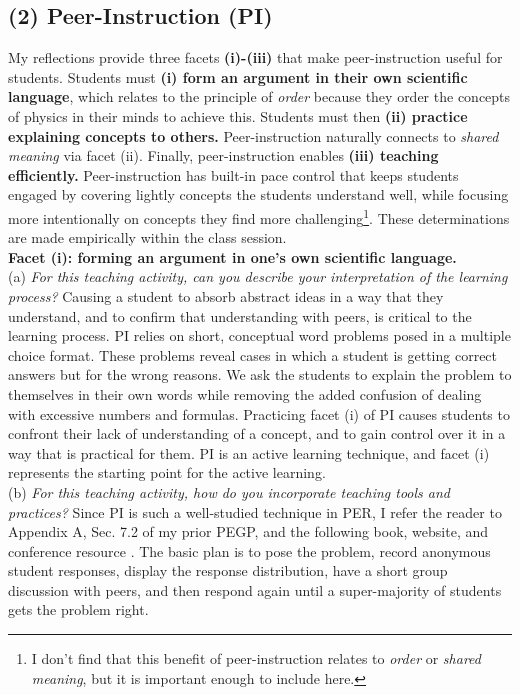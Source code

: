 \documentclass[../../../main.tex]{subfiles}
\begin{document}
\subsection{(2) Peer-Instruction (PI)}

My reflections provide three facets \textbf{(i)-(iii)} that make peer-instruction useful for students.  Students must \textbf{(i) form an argument in their own scientific language}, which relates to the principle of \textit{order} because they order the concepts of physics in their minds to achieve this.  Students must then \textbf{(ii) practice explaining concepts to others.}  Peer-instruction naturally connects to \textit{shared meaning} via facet (ii).  Finally, peer-instruction enables \textbf{(iii) teaching efficiently.}  Peer-instruction has built-in pace control that keeps students engaged by covering lightly concepts the students understand well, while focusing more intentionally on concepts they find more challenging\footnote{I don't find that this benefit of peer-instruction relates to \textit{order} or \textit{shared meaning}, but it is important enough to include here.}.  These determinations are made empirically within the class session.
\\
\vspace{0.25cm}
\textbf{Facet (i): forming an argument in one's own scientific language.}
\\
\vspace{0.25cm}
(a) \textit{For this teaching activity, can you describe your interpretation of the learning process?}  Causing a student to absorb abstract ideas in a way that they understand, and to confirm that understanding with peers, is critical to the learning process.  PI relies on short, conceptual word problems posed in a multiple choice format.  These problems reveal cases in which a student is getting correct answers but for the wrong reasons.  We ask the students to explain the problem to themselves in their own words while removing the added confusion of dealing with excessive numbers and formulas.  Practicing facet (i) of PI causes students to confront their lack of understanding of a concept, and to gain control over it in a way that is practical for them.  PI is an active learning technique, and facet (i) represents the starting point for the active learning.
\\
\vspace{0.25cm}
(b) \textit{For this teaching activity, how do you incorporate teaching tools and practices?}  Since PI is such a well-studied technique in PER, I refer the reader to Appendix A, Sec. 7.2 of my prior PEGP, and the following book, website, and conference resource \cite{mazur2013peer,PhysPort,AAPTPI}.  The basic plan is to pose the problem, record anonymous student responses, display the response distribution, have a short group discussion with peers, and then respond again until a super-majority of students gets the problem right.
\end{document}
